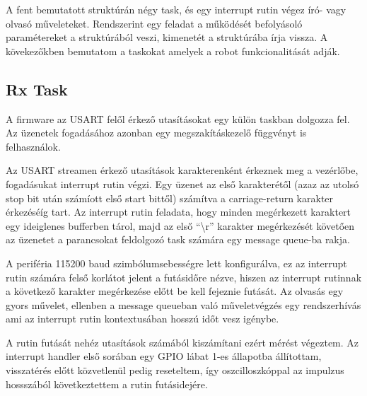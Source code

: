 \medskip

A fent bemutatott struktúrán négy task, és egy interrupt rutin végez író- vagy
olvasó műveleteket. Rendszerint egy feladat a működését befolyásoló paramétereket
a struktúrából veszi, kimenetét a struktúrába írja vissza. A kövekezőkben
bemutatom a taskokat amelyek a robot funkcionalitását adják.

\subsection{Rx Task}

A firmware az USART felől érkező utasításokat egy külön taskban dolgozza fel. Az
üzenetek fogadásához azonban egy megszakításkezelő függvényt is felhasználok.

Az USART streamen érkező utasítások karakterenként érkeznek meg a vezérlőbe,
fogadásukat interrupt rutin végzi. Egy üzenet az első karakterétől (azaz az
utolsó stop bit után számíott első start bittől) számítva a carriage-return
karakter érkezéséíg tart. Az interrupt rutin feladata, hogy minden megérkezett
karaktert egy ideiglenes bufferben tárol, majd az első ``\textbackslash{}r'' karakter
megérkezését követően az üzenetet a parancsokat feldolgozó task számára egy
message queue-ba rakja. 

A periféria 115200 baud szimbólumsebességre lett konfigurálva, ez az interrupt
rutin számára felső korlátot jelent a futásidőre nézve, hiszen az interrupt
rutinnak a következő karakter megérkezése előtt be kell fejeznie futását. Az
olvasás egy gyors művelet, ellenben a message queueban való műveletvégzés egy
rendszerhívás ami az interrupt rutin kontextusában hosszú időt vesz igénybe.

A rutin futását nehéz utasítások számából kiszámítani ezért mérést végeztem. Az
interrupt handler első sorában egy GPIO lábat 1-es állapotba állítottam,
visszatérés előtt közvetlenül pedig reseteltem, így oszcilloszkóppal az impulzus
hossszából következtettem a rutin futásidejére.

